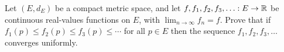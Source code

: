 \begin{problem}
  Let $(E, d_E)$ be a compact metric space, and
  let $f, f_1, f_2, f_3, \ldots : E \to \mathbb{R}$ be continuous real-values functions on $E$,
  with $\displaystyle \lim_{n \to \infty} f_n = f$.
  Prove that if $f_1(p) \leq f_2(p) \leq f_3(p) \leq \cdots$ for all $p \in E$
  then the sequence $f_1, f_2, f_3, \ldots$ converges uniformly.
\end{problem}

\begin{answer}

\end{answer}
